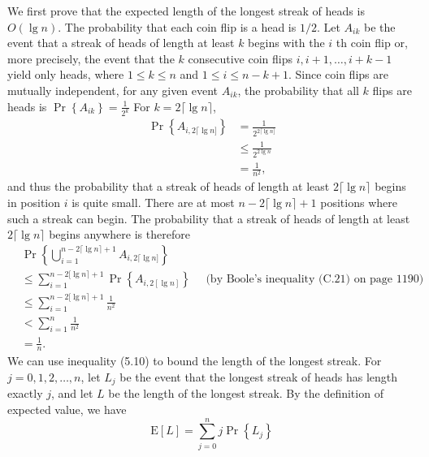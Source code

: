 \documentclass[lang=cn,newtx,10pt,scheme=chinese]{elegantbook}
\begin{document}
We first prove that the expected length of the longest streak of heads is $O(\lg n)$. The probability that each coin flip is a head is $1 / 2$. Let $A_{i k}$ be the event that a streak of heads of length at least $k$ begins with the $i$ th coin flip or, more precisely, the event that the $k$ consecutive coin flips $i, i+1, \ldots, i+k-1$ yield only heads, where $1 \leq k \leq n$ and $1 \leq i \leq n-k+1$. Since coin flips are mutually independent, for any given event $A_{i k}$, the probability that all $k$ flips are heads is
$\operatorname{Pr}\left\{A_{i k}\right\}=\frac{1}{2^k}$
For $k=2\lceil\lg n\rceil$,
$$
\begin{aligned}
\operatorname{Pr}\left\{A_{i, 2\lceil\lg n]}\right\} & =\frac{1}{2^{2\lceil\lg n]}} \\
& \leq \frac{1}{2^{2 \lg n}} \\
& =\frac{1}{n^2},
\end{aligned}
$$
and thus the probability that a streak of heads of length at least $2\lceil\lg n\rceil$ begins in position $i$ is quite small. There are at most $n-2\lceil\lg n\rceil+1$ positions where such a streak can begin. The probability that a streak of heads of length at least $2\lceil\lg n\rceil$ begins anywhere is therefore
$$
\begin{aligned}
& \operatorname{Pr}\left\{\bigcup_{i=1}^{n-2\lceil\lg n\rceil+1} A_{i, 2\lceil\lg n]}\right\} \\
& \leq \sum_{i=1}^{n-2[\lg n\rceil+1} \operatorname{Pr}\left\{A_{i, 2[\lg n]}\right\} \quad \text { (by Boole's inequality (C.21) on page 1190) } \\
& \leq \sum_{i=1}^{n-2[\lg n\rceil+1} \frac{1}{n^2} \\
&<\sum_{i=1}^n \frac{1}{n^2} \\
&=\frac{1}{n} .
\end{aligned}
$$
We can use inequality (5.10) to bound the length of the longest streak. For $j=0,1,2, \ldots, n$, let $L_j$ be the event that the longest streak of heads has length exactly $j$, and let $L$ be the length of the longest streak. By the definition of expected value, we have
$$
\mathrm{E}[L]=\sum_{j=0}^n j \operatorname{Pr}\left\{L_j\right\}
$$
\end{document}
